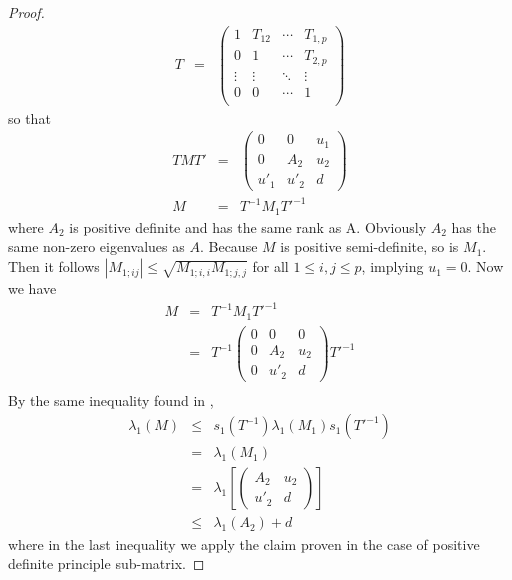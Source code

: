 \documentclass{article}
\begin{document}
\begin{proof}
\begin{eqnarray*}
    T &=& 
    \begin{pmatrix}
      1 & T_{12} & \cdots & T_{1,p} \\
      0 & 1 & \cdots & T_{2, p} \\
      \vdots & \vdots & \ddots & \vdots \\
      0 & 0 & \cdots & 1 \\
    \end{pmatrix}
  \end{eqnarray*}
  so that
  \begin{eqnarray*}
    T M T'&=&
    \begin{pmatrix}
      0 & 0 & u_1 \\
      0 & A_2 & u_2 \\
      u'_1 & u'_2 & d
    \end{pmatrix} \\
    M  &=& T^{-1} M_1 T'^{-1}
  \end{eqnarray*}
  where $A_2$ is positive definite and has the same rank as
  A. Obviously $A_2$ has the same non-zero eigenvalues as $A$.
  Because $M$ is positive semi-definite, so is $M_1$. Then it follows
  $|M_{1;ij}| \leq \sqrt{M_{1;i,i} M_{1;j,j}}$ for all $1 \leq i,j
  \leq p$, implying $u_1 = 0$. Now we have
  \begin{eqnarray*}
    M &=& T^{-1} M_1 T'^{-1} \\
    &=& T^{-1}
    \begin{pmatrix}
      0 & 0 & 0 \\
      0 & A_2 & u_2 \\
      0 & u'_2 & d
    \end{pmatrix} T'^{-1} \\
  \end{eqnarray*}
  By the same inequality found in \cite{BaiSilverstein2010},
  \begin{eqnarray*}
    \lambda_1(M) &\leq& s_1(T^{-1}) \lambda_1(M_1) s_1(T'^{-1}) \\
    &=& \lambda_1(M_1) \\
    &=& \lambda_1 \left[\left(
      \begin{array}{cc}
        A_2 & u_2 \\
        u'_2 & d
      \end{array} \right)\right] \\
  &\leq& \lambda_1(A_2) + d
  \end{eqnarray*}
  where in the last inequality we apply the claim proven in the case
  of positive definite principle sub-matrix.
\end{proof}


\end{document}
